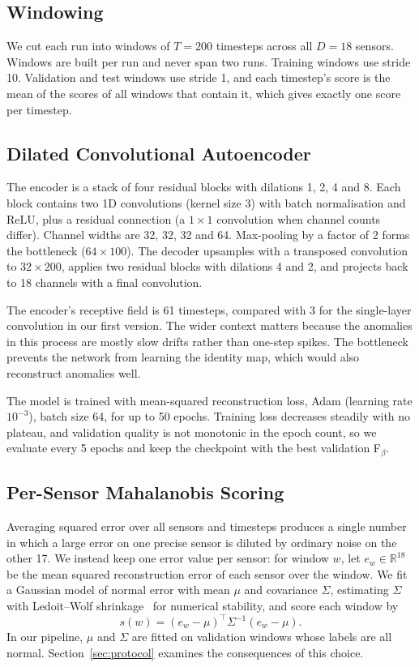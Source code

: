 \documentclass[runningheads]{llncs}
\begin{document}
\subsection{Windowing}

We cut each run into windows of $T = 200$ timesteps across all $D = 18$ sensors. Windows are built per run and never span two runs. Training windows use stride 10. Validation and test windows use stride 1, and each timestep's score is the mean of the scores of all windows that contain it, which gives exactly one score per timestep.

\subsection{Dilated Convolutional Autoencoder}

The encoder is a stack of four residual blocks with dilations 1, 2, 4 and 8. Each block contains two 1D convolutions (kernel size 3) with batch normalisation and ReLU, plus a residual connection (a $1\times1$ convolution when channel counts differ). Channel widths are 32, 32, 32 and 64. Max-pooling by a factor of 2 forms the bottleneck ($64 \times 100$). The decoder upsamples with a transposed convolution to $32 \times 200$, applies two residual blocks with dilations 4 and 2, and projects back to 18 channels with a final convolution.

The encoder's receptive field is 61 timesteps, compared with 3 for the single-layer convolution in our first version. The wider context matters because the anomalies in this process are mostly slow drifts rather than one-step spikes. The bottleneck prevents the network from learning the identity map, which would also reconstruct anomalies well.

The model is trained with mean-squared reconstruction loss, Adam (learning rate $10^{-3}$), batch size 64, for up to 50 epochs. Training loss decreases steadily with no plateau, and validation quality is not monotonic in the epoch count, so we evaluate every 5 epochs and keep the checkpoint with the best validation F$_\beta$.

\subsection{Per-Sensor Mahalanobis Scoring}

Averaging squared error over all sensors and timesteps produces a single number in which a large error on one precise sensor is diluted by ordinary noise on the other 17. We instead keep one error value per sensor: for window $w$, let $e_w \in \mathbb{R}^{18}$ be the mean squared reconstruction error of each sensor over the window. We fit a Gaussian model of normal error with mean $\mu$ and covariance $\Sigma$, estimating $\Sigma$ with Ledoit--Wolf shrinkage~\cite{ledoit2004well} for numerical stability, and score each window by
\begin{equation}
  s(w) = (e_w - \mu)^\top \Sigma^{-1} (e_w - \mu).
\end{equation}
In our pipeline, $\mu$ and $\Sigma$ are fitted on validation windows whose labels are all normal. Section~\ref{sec:protocol} examines the consequences of this choice.
\end{document}
